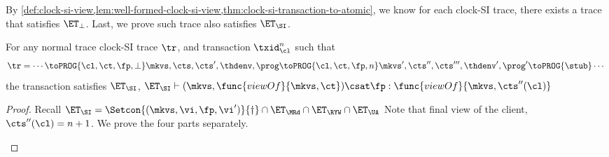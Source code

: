 By \cref{def:clock-si-view,lem:well-formed-clock-si-view,thm:clock-si-transaction-to-atomic},
we know for each clock-SI trace, there exists a trace that satisfies \( \ET_\perp \).
Last, we prove such trace also satisfies \( \ET_\SI \).
\begin{theorem}
    For any normal trace clock-SI trace \( \tr \), and transaction \( \txid_\cl^{n} \) such that
    \[
        \tr = \cdots \toPROG{\cl, \ct, \fp, \perp} \mkvs, \cts, \cts', \thdenv, \prog  \toPROG{\cl, \ct, \fp, n} \mkvs', \cts'', \cts''', \thdenv', \prog' \toPROG{\stub} \cdots
    \]
    the transaction satisfies \( \ET_\SI \), \ie \( \ET_\SI \vdash (\mkvs, \func{viewOf}{\mkvs,\ct}) \csat \fp : \func{viewOf}{\mkvs,\cts''(\cl)} \)
\end{theorem}
\begin{proof}
    Recall \( \ET_\SI  = \Setcon{(\mkvs, \vi, \fp, \vi')}{\dagger} \cap \ET_\MRd \cap \ET_\RYW  \cap \ET_\UA \)
    Note that final view of the client, \( \cts''(\cl) = n + 1 \).
    We prove the four parts separately.
    \begin{itemize}

\end{itemize}
\end{proof}
